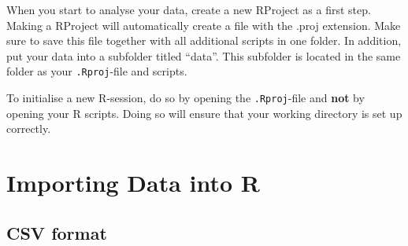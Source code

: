 \documentclass[
  letterpaper,
  DIV=11,
  numbers=noendperiod]{scrreprt}
\begin{document}
\begin{tcolorbox}[enhanced jigsaw, opacityback=0, left=2mm, colback=white, breakable, toprule=.15mm, colframe=quarto-callout-tip-color-frame, leftrule=.75mm, arc=.35mm, rightrule=.15mm, bottomrule=.15mm]
\begin{minipage}[t]{5.5mm}
\textcolor{quarto-callout-tip-color}{\faLightbulb}
\end{minipage}%
\begin{minipage}[t]{\textwidth - 5.5mm}

When you start to analyse your data, create a new RProject as a first
step. Making a RProject will automatically create a file with the .proj
extension. Make sure to save this file together with all additional
scripts in one folder. In addition, put your data into a subfolder
titled ``data''. This subfolder is located in the same folder as your
\texttt{.Rproj}-file and scripts.

\end{minipage}%
\end{tcolorbox}

\begin{tcolorbox}[enhanced jigsaw, opacityback=0, left=2mm, colback=white, breakable, toprule=.15mm, colframe=quarto-callout-caution-color-frame, leftrule=.75mm, arc=.35mm, rightrule=.15mm, bottomrule=.15mm]
\begin{minipage}[t]{5.5mm}
\textcolor{quarto-callout-caution-color}{\faFire}
\end{minipage}%
\begin{minipage}[t]{\textwidth - 5.5mm}

To initialise a new R-session, do so by opening the \texttt{.Rproj}-file
and \textbf{not} by opening your R scripts. Doing so will ensure that
your working directory is set up correctly.

\end{minipage}%
\end{tcolorbox}


\hypertarget{importing-data-into-r}{%
\chapter{Importing Data into R}\label{importing-data-into-r}}

\hfill\break

\hypertarget{csv-format}{%
\section{CSV format}\label{csv-format}}
\end{document}
